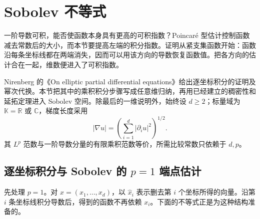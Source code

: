 \section{Sobolev 不等式}
\label{b1:sec:2402}

一阶导数可积，能否使函数本身具有更高的可积指数？Poincaré 型估计控制函数减去常数后的大小，而本节要提高左端的积分指数。证明从紧支集函数开始：函数沿每条坐标线都在两端消失，因而可以用该方向的导数恢复函数值。把各方向的估计合在一起，维数便进入了可积指数。

\ProseParagraphBreak

Nirenberg 的《On elliptic partial differential equations》\cite[Lecture II, pp. 128--129]{Nirenberg1959Elliptic}给出逐坐标积分的证明及幂次代换。本节把其中的乘积积分步骤写成任意维归纳，再用已经建立的稠密性和延拓定理进入 Sobolev 空间。除最后的一维说明外，始终设 \(d\geq2\)；标量域为 \(\mathbb K=\mathbb R\) 或 \(\mathbb C\)，梯度长度采用
\[
 |\nabla u|=\left(\sum_{i=1}^d|\partial_i u|^2\right)^{1/2}.
\]
其 \(L^p\) 范数与一阶导数分量的有限乘积范数等价，所需比较常数只依赖于 \(d,p\)。


\subsection{逐坐标积分与 Sobolev 的 \texorpdfstring{\(p=1\)}{p=1} 端点估计}
\label{b1:subsec:240201}

先处理 \(p=1\)。对 \(x=(x_1,\ldots,x_d)\)，以 \(\widehat{x}_i\) 表示删去第 \(i\) 个坐标所得的向量。沿第 \(i\) 条坐标线积分导数后，得到的函数不再依赖 \(x_i\)。下面的不等式正是为这种结构准备的。

